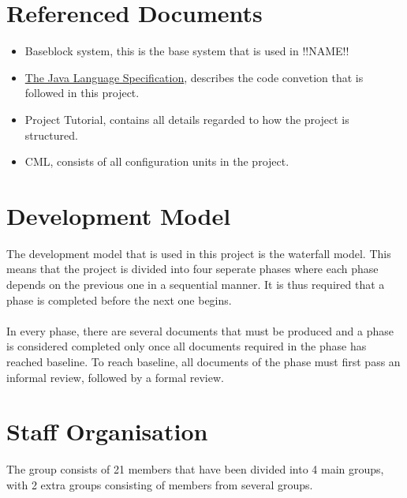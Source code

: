 \documentclass{article}
\begin{document}
\section{Referenced Documents}
    \begin{itemize}
        \item Baseblock system,  this is the base system that is used in !!NAME!!
        \item \href{https://docs.oracle.com/javase/specs/jls/se11/html/index.html}{The Java Language Specification}, describes the code convetion that is followed in this project.
        \item \label{PH} Project Tutorial, contains all details regarded to how the project is                   structured.
        \item CML, consists of all configuration units in the project.
    \end{itemize}
    

\section{Development Model} %
    The development model that is used in this project is the waterfall model. This
    means that the project is divided into four seperate phases where each phase depends
    on the previous one in a sequential manner. It is thus required that a phase is
    completed before the next one begins.
    \\ \\
    In every phase, there are several documents that must be produced and a phase
    is considered completed only once all documents required in the phase has reached baseline.
    To reach baseline, all documents of the phase must first pass an informal review, 
    followed by a formal review.
    
\section{Staff Organisation} %
    The group consists of 21 members that have been divided into 4 main groups, with 2 extra groups consisting of members from several groups. 
\end{document}
